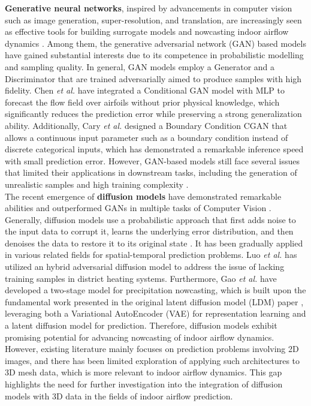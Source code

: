 \documentclass[final-report]{article-template}
\begin{document}
\textbf{Generative neural networks}, inspired by advancements in computer vision such as image generation, super-resolution, and translation, are increasingly seen as effective tools for building surrogate models and nowcasting indoor airflow dynamics \cite{shu2023physics, rossella2021latent}. Among them, the generative adversarial network (GAN) based models have gained substantial interests due to its competence in probabilistic modelling and sampling quality. In general, GAN models employ a Generator and a Discriminator that are trained adversarially aimed to produce samples with high fidelity. Chen \textit{et al.} \cite{chen2020flowgan} have integrated a Conditional GAN model with MLP to forecast the flow field over airfoils without prior physical knowledge, which significantly reduces the prediction error while preserving a strong generalization ability. Additionally, Cary \textit{et al.} \cite{faulkner2023fast} designed a Boundary Condition CGAN that allows a continuous input parameter such as a boundary condition instead of discrete categorical inputs, which has demonstrated  a remarkable inference speed with small prediction error. However, GAN-based models still face several issues that limited their applications in downstream tasks, including the generation of unrealistic samples and high training complexity \cite{shu2023physics, rossella2021latent}.\\

The recent emergence of \textbf{diffusion models} have demonstrated remarkable abilities and outperformed GANs in multiple tasks of Computer Vision \cite{rombach2022highresolution}. Generally, diffusion models use a probabilistic approach that first adds noise to the input data to corrupt it, learns the underlying error distribution, and then denoises the data to restore it to its original state \cite{gao2024prediff}. It has been gradually applied in various related fields for spatial-temporal prediction problems. Luo \textit{et al.} \cite{luo2024investigation} has utilized an hybrid adversarial diffusion model to address the issue of lacking training samples in district heating systems. Furthermore, Gao \textit{et al.} \cite{gao2024prediff} have developed a two-stage model for precipitation nowcasting, which is built upon the fundamental work presented in the original latent diffusion model (LDM) paper \cite{rombach2022highresolution}, leveraging both a Variational AutoEncoder (VAE) for representation learning and a latent diffusion model for prediction. Therefore, diffusion models exhibit promising potential for advancing nowcasting of indoor airflow dynamics. However, existing literature mainly focuses on prediction problems involving 2D images, and there has been limited exploration of applying such architectures to 3D mesh data, which is more relevant to indoor airflow dynamics. This gap highlights the need for further investigation into the integration of diffusion models with 3D data in the fields of indoor airflow prediction.
\end{document}
